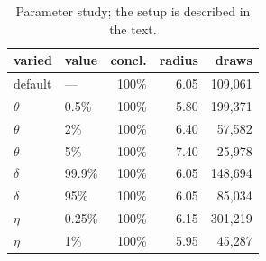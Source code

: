 \begin{table}
{%
\centering\scriptsize
\setlength{\tabcolsep}{4pt}
\caption{Parameter study; the setup is described in the text.}
\label{tab:param}
\begin{tabular}{llrrr}
\toprule
varied & value & concl. & radius & draws \\
\midrule
default & --- & 100\% & 6.05 & 109,061 \\
$\theta$ & 0.5\% & 100\% & 5.80 & 199,371 \\
$\theta$ & 2\% & 100\% & 6.40 & 57,582 \\
$\theta$ & 5\% & 100\% & 7.40 & 25,978 \\
$\delta$ & 99.9\% & 100\% & 6.05 & 148,694 \\
$\delta$ & 95\% & 100\% & 6.05 & 85,034 \\
$\eta$ & 0.25\% & 100\% & 6.15 & 301,219 \\
$\eta$ & 1\% & 100\% & 5.95 & 45,287 \\
\bottomrule
\end{tabular}%
}
\end{table}
